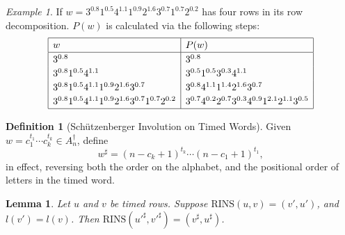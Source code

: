 \documentclass[10pt]{amsproc}
\newtheorem{lemma}[theorem]{Lemma}
\theoremstyle{definition}
\newtheorem{definition}[theorem]{Definition}
\theoremstyle{remark}
\newtheorem{example}[theorem]{Example}
\newcommand{\rowins}{\mathrm{RINS}}
\begin{document}
\begin{example}
  If $w=3^{0.8}1^{0.5}4^{1.1}1^{0.9}2^{1.6}3^{0.7}1^{0.7}2^{0.2}$ has four rows in its row decomposition.
  $P(w)$ is calculated via the following steps:
  \begin{displaymath}
    \renewcommand{\arraystretch}{1.2}
    \begin{array}{|l|l|}
      \hline
      w & P(w)\\
      \hline
      3^{0.8} & 3^{0.8}\\
      3^{0.8}1^{0.5}4^{1.1} & 3^{0.5}1^{0.5}3^{0.3}4^{1.1}\\
      3^{0.8}1^{0.5}4^{1.1}1^{0.9}2^{1.6}3^{0.7} & 3^{0.8}4^{1.1}1^{1.4}2^{1.6}3^{0.7}\\
      3^{0.8}1^{0.5}4^{1.1}1^{0.9}2^{1.6}3^{0.7}1^{0.7}2^{0.2} & 3^{0.7}4^{0.2}2^{0.7}3^{0.3}4^{0.9}1^{2.1}2^{1.1}3^{0.5}\\
      \hline
    \end{array}
    \renewcommand{\arraystretch}{1}
  \end{displaymath}
\end{example}
\begin{definition}
  [Sch\"utzenberger Involution on Timed Words]
  \label{definition:schuetzenberger-involution}
  Given $w=c_1^{t_1}\dotsb c_k^{t_k}\in A_n^\dagger$, define
  \begin{equation}
    \label{eq:sharp}
    w^\sharp = (n-c_k+1)^{t_k} \dotsb (n-c_1+1)^{t_1},
  \end{equation}
  in effect, reversing both the order on the alphabet, and the positional order of letters in the timed word.
\end{definition}
\begin{lemma}
  \label{lemma:reverse-row-insertion}
  Let $u$ and $v$ be timed rows.
  Suppose $\rowins(u,v)=(v',u')$, and $l(v')=l(v)$.
  Then $\rowins({u'}^\sharp,{v'}^\sharp)=(v^\sharp,u^\sharp)$.
\end{lemma}
\end{document}
